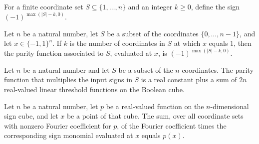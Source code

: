 \begin{definition}
\label{FABL.parityCountProfile}
\leanok
{}
For a finite coordinate set $S\subseteq\{1,\ldots,n\}$ and an integer $k\ge0$, define
the sign $(-1)^{\max(|S|-k,0)}$.
\end{definition}

\begin{theorem}
\label{FABL.parityFunction_eq_parityCountProfile}
\leanok
{}
Let $n$ be a natural number, let $S$ be a subset of the coordinates
$\{0,\ldots,n-1\}$, and let $x\in\{ -1,1\}^n$. If $k$ is the number of coordinates
in $S$ at which $x$ equals $1$, then the parity function associated to $S$, evaluated at
$x$, is $(-1)^{\max(|S|-k,0)}$.
\end{theorem}

\begin{theorem}
\label{FABL.parityFunction_isRealSumOfLinearThresholds}
\leanok
{}
Let $n$ be a natural number and let $S$ be a subset of the $n$ coordinates. The parity
function that multiplies the input signs in $S$ is a real constant plus a sum of $2n$
real-valued linear threshold functions on the Boolean cube.
\end{theorem}

\begin{theorem}
\label{FABL.fourier_expansion_over_support}
\leanok
{}
Let $n$ be a natural number, let $p$ be a real-valued function on the $n$-dimensional
sign cube, and let $x$ be a point of that cube. The sum, over all coordinate sets with
nonzero Fourier coefficient for $p$, of the Fourier coefficient times the corresponding
sign monomial evaluated at $x$ equals $p(x)$.
\end{theorem}

